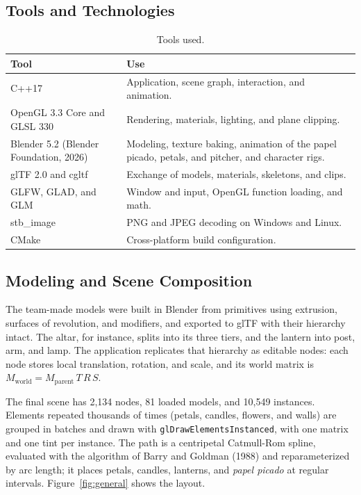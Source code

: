\documentclass[letter,12pt]{article}
\begin{document}
	\subsection{Tools and Technologies}
	\begin{table}[H]
		\centering
		\small
		\begin{tabularx}{\textwidth}{p{4.0cm}X}
			\toprule
			\textbf{Tool} & \textbf{Use}\\
			\midrule
			C++17 & Application, scene graph, interaction, and animation. \\
			OpenGL 3.3 Core and GLSL 330 & Rendering, materials, lighting, and plane clipping. \\
			Blender 5.2 (Blender Foundation, 2026) & Modeling, texture baking, animation of the papel picado, petals, and pitcher, and character rigs. \\
			glTF 2.0 and cgltf & Exchange of models, materials, skeletons, and clips. \\
			GLFW, GLAD, and GLM & Window and input, OpenGL function loading, and math. \\
			stb\_image & PNG and JPEG decoding on Windows and Linux. \\
			CMake & Cross-platform build configuration. \\
			\bottomrule
		\end{tabularx}
		\caption{Tools used.}
		\label{tab:tools}
	\end{table}

	\subsection{Modeling and Scene Composition}
	The team-made models were built in Blender from primitives using extrusion, surfaces of revolution, and modifiers, and exported to glTF with their hierarchy intact. The altar, for instance, splits into its three tiers, and the lantern into post, arm, and lamp. The application replicates that hierarchy as editable nodes: each node stores local translation, rotation, and scale, and its world matrix is $M_{\text{world}} = M_{\text{parent}}\, T\, R\, S$.

	The final scene has 2,134 nodes, 81 loaded models, and 10,549 instances. Elements repeated thousands of times (petals, candles, flowers, and walls) are grouped in batches and drawn with \texttt{glDrawElementsInstanced}, with one matrix and one tint per instance. The path is a centripetal Catmull-Rom spline, evaluated with the algorithm of Barry and Goldman (1988) and reparameterized by arc length; it places petals, candles, lanterns, and \textit{papel picado} at regular intervals. Figure~\ref{fig:general} shows the layout.
\end{document}
